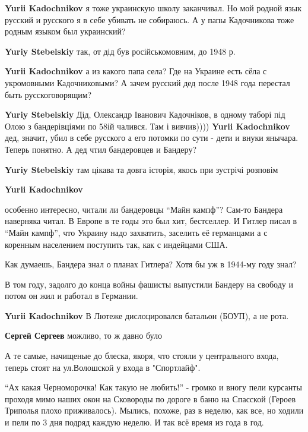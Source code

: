 \begin{itemize}
\begin{itemize}
\begin{itemize}
\textbf{Yurii Kadochnikov} я тоже украинскую школу заканчивал. Но мой родной язык русский и русского я в себе убивать не собираюсь.
А у папы Кадочникова тоже родным языком был украинский?

\textbf{Yuriy Stebelskiy} так, от дід був російськомовним, до 1948 р.

\textbf{Yurii Kadochnikov} а из какого папа села? Где на Украине есть сёла с укромовными Кадочниковыми?
А зачем русский дед после 1948 года перестал быть русскоговорящим?

\textbf{Yuriy Stebelskiy} Дід, Олександр Іванович Кадочніков, в одному таборі під Олою з бандерівціями по 58ій чалився. Там і вивчив))))
\textbf{Yurii Kadochnikov} дед, значит, убил в себе русского а его потомки по сути - дети и внуки янычара. Теперь понятно.
А дед чтил бандеровцев и Бандеру?

\textbf{Yuriy Stebelskiy} там цікава та довга історія, якось при зустрічі розповім

\textbf{Yurii Kadochnikov} 

особенно интересно, читали ли бандеровцы \enquote{Майн кампф}? Сам-то Бандера наверняка
читал. В Европе в те годы это был хит, бестселлер. И Гитлер писал в \enquote{Майн
кампф}, что Украину надо захватить, заселить её германцами а с коренным
населением поступить так, как с индейцами США.

Как думаешь, Бандера знал о планах Гитлера? Хотя бы уж в 1944-му году знал?

В том году, задолго до конца войны фашисты выпустили Бандеру на свободу и потом
он жил и работал в Германии.
\end{itemize} %

\textbf{Yurii Kadochnikov} В Лютеже дислоцировался батальон (БОУП), а не рота.

\textbf{Сергей Сергеев} можливо, то ж давно було

\end{itemize} %


А те самые, начищеные до блеска, якоря, что стояли у центрального входа, теперь
стоят на ул.Волошской у входа в "Спортлайф".


\enquote{Ах какая Черноморочка! Как такую не любить!} - громко и вногу пели курсанты
проходя мимо наших окон на Сковороды по дороге в баню на Спасской (Героев
Триполья плохо приживалось). Мылись, похоже, раз в неделю, как все, но ходили и
пели по 3 дня подряд каждую неделю. И так всё время из года в год.


\end{itemize}
